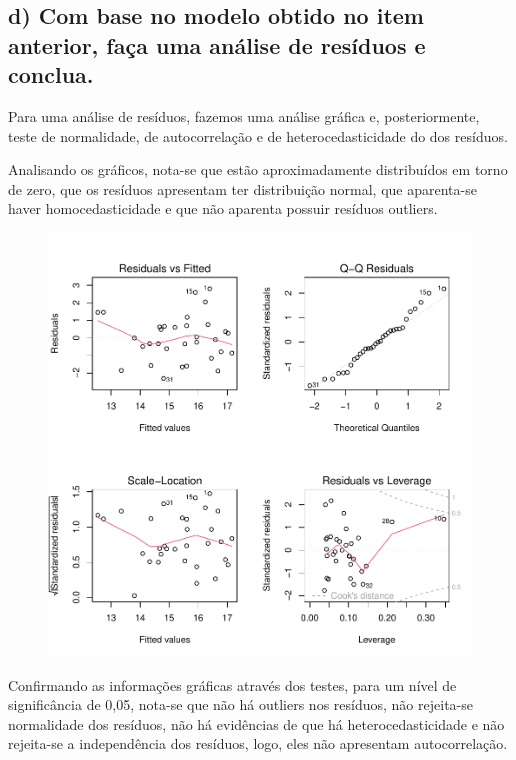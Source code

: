 \documentclass[
  letterpaper,
  DIV=11,
  numbers=noendperiod]{scrartcl}
\begin{document}
\hypertarget{d-com-base-no-modelo-obtido-no-item-anterior-fauxe7a-uma-anuxe1lise-de-resuxedduos-e-conclua.}{%
\subsection{d) Com base no modelo obtido no item anterior, faça uma
análise de resíduos e
conclua.}\label{d-com-base-no-modelo-obtido-no-item-anterior-fauxe7a-uma-anuxe1lise-de-resuxedduos-e-conclua.}}

Para uma análise de resíduos, fazemos uma análise gráfica e,
posteriormente, teste de normalidade, de autocorrelação e de
heterocedasticidade do dos resíduos.

Analisando os gráficos, nota-se que estão aproximadamente distribuídos
em torno de zero, que os resíduos apresentam ter distribuição normal,
que aparenta-se haver homocedasticidade e que não aparenta possuir
resíduos outliers.

\begin{figure}

{\centering \includegraphics{lista2_files/figure-pdf/unnamed-chunk-17-1.pdf}

}

\end{figure}

Confirmando as informações gráficas através dos testes, para um nível de
significância de 0,05, nota-se que não há outliers nos resíduos, não
rejeita-se normalidade dos resíduos, não há evidências de que há
heterocedasticidade e não rejeita-se a independência dos resíduos, logo,
eles não apresentam autocorrelação.
\end{document}
